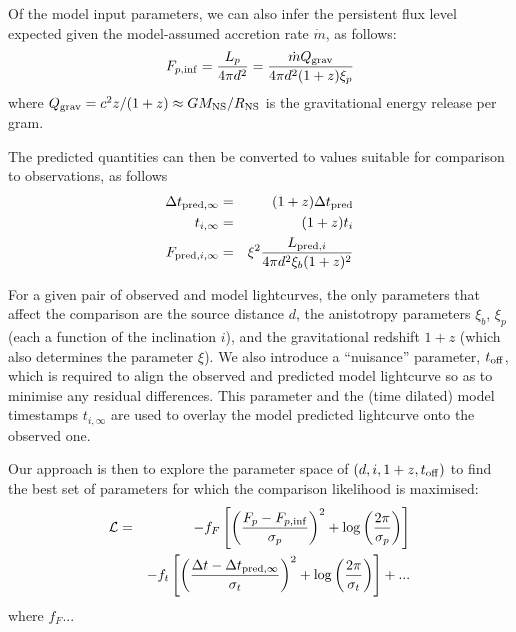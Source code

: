 \documentclass{aastex61}
\begin{document}
Of the model input parameters, we can also infer the persistent flux level expected given the model-assumed accretion rate $\dot{m}$, as follows: %
\begin{equation}
F_{p,{\rm inf}} = \frac{L_p}{4\pi d^2} = 
\frac{\dot{m} Q_{\rm grav}}{4\pi d^2 (1+z)\xi_p}%
\end{equation}
where $Q_{\rm grav} = c^2z/(1+z) \approx GM_{\rm NS}/R_{\rm NS}$ is the gravitational energy release per gram. %

The predicted quantities can then be converted to values suitable for comparison to observations, as follows
\begin{eqnarray}
\Delta t_{{\rm pred},\infty} & = & (1+z)\Delta t_{\rm pred} \\
t_{i,\infty} & = & (1+z)t_i \\
F_{{\rm pred},i,\infty} & = & \xi^2\frac{L_{{\rm pred},i}}{4\pi d^2\xi_b(1+z)^2}
\end{eqnarray}

For a given pair of observed and model lightcurves, the only parameters that affect the comparison are the source distance $d$, the anistotropy parameters $\xi_b$, $\xi_p$ (each a function of the inclination $i$), and the gravitational redshift $1+z$ (which also determines the parameter $\xi$).
%
We also introduce a ``nuisance'' parameter, $t_{\rm off}$, which is required to align the observed and predicted model lightcurve so as to minimise any residual differences. This parameter and the (time dilated) model timestamps $t_{i,\infty}$ are used to overlay the model predicted lightcurve onto the observed one.

Our approach is then to explore the parameter space of $(d, i, 1+z, t_{\rm off})$ to find the best set of parameters for which the comparison likelihood is maximised:
\begin{eqnarray}
\mathcal{L} & = & -f_F\left[\left( \frac{F_p-F_{p,\rm{inf}}}{\sigma_{p}}\right)^2 
    + \log\left(\frac{2\pi}{\sigma_p}\right)\right] \\
 & & -f_t\left[ \left( \frac{\Delta t-\Delta t_{{\rm pred},\infty}}{\sigma_t}\right)^2
    + \log\left(\frac{2\pi}{\sigma_t}\right)\right] + ...\\
\end{eqnarray}
where $f_F$...
\end{document}
